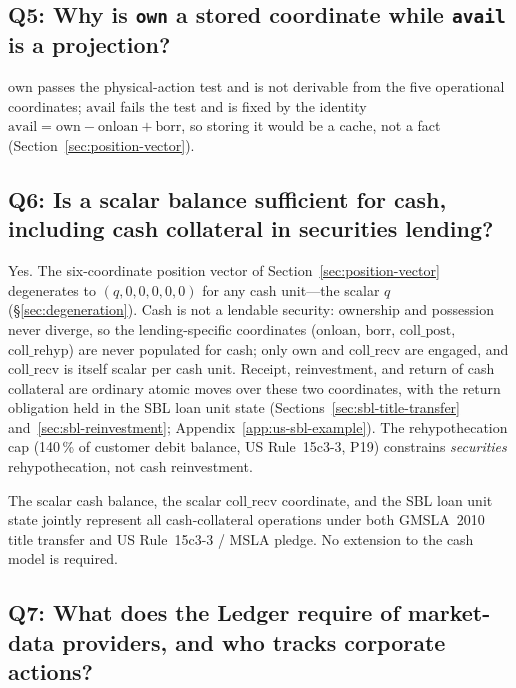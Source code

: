 \documentclass[11pt,a4paper]{article}
\begin{document}
\subsection*{Q5: Why is \texttt{own} a stored coordinate while \texttt{avail} is a projection?}

$\mathrm{own}$ passes the physical-action test and is not derivable from the five operational coordinates; $\mathrm{avail}$ fails the test and is fixed by the identity $\mathrm{avail} = \mathrm{own} - \mathrm{onloan} + \mathrm{borr}$, so storing it would be a cache, not a fact (Section~\ref{sec:position-vector}).

\subsection*{Q6: Is a scalar balance sufficient for cash, including cash collateral in securities lending?}

Yes. The six-coordinate position vector of Section~\ref{sec:position-vector} degenerates to $(q,0,0,0,0,0)$ for any cash unit---the scalar $q$ (\S\ref{sec:degeneration}). Cash is not a lendable security: ownership and possession never diverge, so the lending-specific coordinates ($\mathrm{onloan}$, $\mathrm{borr}$, $\mathrm{coll\_post}$, $\mathrm{coll\_rehyp}$) are never populated for cash; only $\mathrm{own}$ and $\mathrm{coll\_recv}$ are engaged, and $\mathrm{coll\_recv}$ is itself scalar per cash unit. Receipt, reinvestment, and return of cash collateral are ordinary atomic moves over these two coordinates, with the return obligation held in the SBL loan unit state (Sections~\ref{sec:sbl-title-transfer} and~\ref{sec:sbl-reinvestment}; Appendix~\ref{app:us-sbl-example}). The rehypothecation cap (140\,\% of customer debit balance, US Rule~15c3-3, P19) constrains \emph{securities} rehypothecation, not cash reinvestment.

The scalar cash balance, the scalar $\mathrm{coll\_recv}$ coordinate, and the SBL loan unit state jointly represent all cash-collateral operations under both GMSLA~2010 title transfer and US Rule~15c3-3 / MSLA pledge. No extension to the cash model is required.

\subsection*{Q7: What does the Ledger require of market-data providers, and who tracks corporate actions?}
\end{document}
